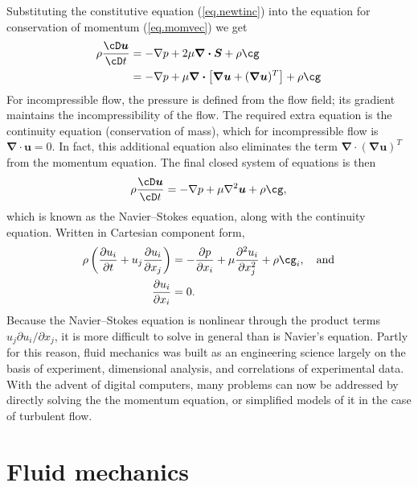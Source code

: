 \documentclass[a4paper,11pt]		{report}
\begin{document}
Substituting the constitutive equation (\ref{eq.newtinc}) into the
equation for conservation of momentum (\ref{eq.momvec}) we get
\begin{align}
\rho\frac{\cD \bm{u}}{\cD t}
&=
-\nabla p + 2\mu\bm{\nabla\cdot S} +
 \rho\bm{\cg}\\
&=
-\nabla p+\mu\bm{\nabla\cdot}\left[\bm{\nabla u}+(\bm{\nabla u})^T\right] + 
 \rho\bm{\cg}
\end{align}
For incompressible flow, the pressure is defined from the flow field;
its gradient maintains the incompressibility of the flow. The required
extra equation is the continuity equation (conservation of mass),
which for incompressible flow is $\bm{\nabla\cdot u}=0$.  In fact,
this additional equation also eliminates the term
$\bm{\nabla\cdot}(\bm{\nabla u})^T$ from the momentum equation. The
final closed system of equations is then
\begin{equation}
\rho\frac{\cD \bm{u}}{\cD t}
=
-\nabla p+\mu\nabla^2\bm{u} + \rho\bm{\cg},
\end{equation}
which is known as the Navier--Stokes equation, along with the
continuity equation.
Written in Cartesian component form,
\begin{align}
\rho\left(\frac{\partial u_i}{\partial t} + u_j\frac{\partial
  u_i}{\partial x_j}\right)
&=
-\frac{\partial p}{\partial x_i} + \mu \frac{\partial^2 u_i}{\partial x_j^2} +
\rho\cg_i, \quad\textrm{and}\\
\frac{\partial u_i}{\partial x_i}
&=
0.
\end{align}
Because the Navier--Stokes equation is nonlinear through the product
terms $u_j\partial u_i/\partial x_j$, it is more difficult to solve in
general than is Navier's equation. Partly for this reason, fluid
mechanics was built as an engineering science largely on the basis of
experiment, dimensional analysis, and correlations of experimental
data. With the advent of digital computers, many problems can now be
addressed by directly solving the the momentum equation, or simplified
models of it in the case of turbulent flow.


\part{Fluid mechanics}

\end{document}
